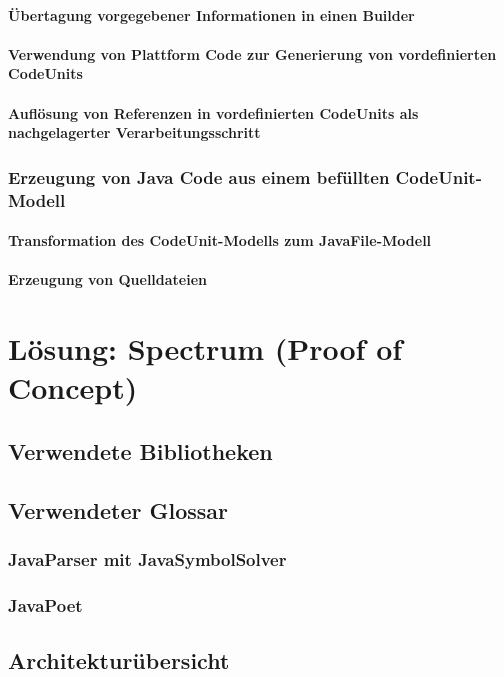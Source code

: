 \documentclass[12pt,oneside,a4paper,parskip]{scrbook}
\begin{document}
\subsubsection{Übertagung vorgegebener Informationen in einen Builder}
\subsubsection{Verwendung von Plattform Code zur Generierung von vordefinierten CodeUnits}
\subsubsection{Auflösung von Referenzen in vordefinierten CodeUnits als nachgelagerter Verarbeitungsschritt}
\subsection{Erzeugung von Java Code aus einem befüllten CodeUnit-Modell}
\subsubsection{Transformation des CodeUnit-Modells zum JavaFile-Modell}
\subsubsection{Erzeugung von Quelldateien}

\chapter{Lösung: Spectrum (Proof of Concept)}
\section{Verwendete Bibliotheken}
\section{Verwendeter Glossar}
\subsection{JavaParser mit JavaSymbolSolver}
\subsection{JavaPoet}
\section{Architekturübersicht}
\end{document}
